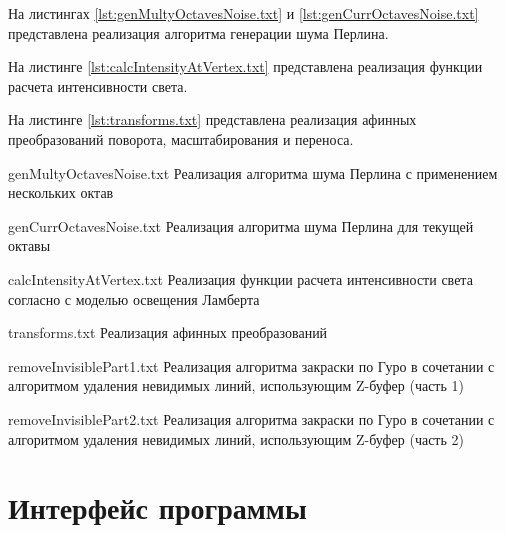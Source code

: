 На листингах \ref{lst:genMultyOctavesNoise.txt} и \ref{lst:genCurrOctavesNoise.txt} представлена реализация алгоритма генерации шума Перлина.

На листинге \ref{lst:calcIntensityAtVertex.txt} представлена реализация функции расчета интенсивности света.

На листинге \ref{lst:transforms.txt} представлена реализация афинных преобразований поворота, масштабирования и переноса.

{genMultyOctavesNoise.txt} %
{Реализация алгоритма шума Перлина с применением нескольких октав} %

\clearpage

{genCurrOctavesNoise.txt} %
{Реализация алгоритма шума Перлина для текущей октавы} %

{calcIntensityAtVertex.txt} %
{Реализация функции расчета интенсивности света согласно с моделью освещения Ламберта} %

\clearpage

{transforms.txt} %
{Реализация афинных преобразований} %

\clearpage

{removeInvisiblePart1.txt} %
{Реализация алгоритма закраски по Гуро в сочетании с алгоритмом удаления невидимых линий, использующим Z-буфер (часть 1)} %

{removeInvisiblePart2.txt} %
{Реализация алгоритма закраски по Гуро в сочетании с алгоритмом удаления невидимых линий, использующим Z-буфер (часть 2)} %

\section{Интерфейс программы}



